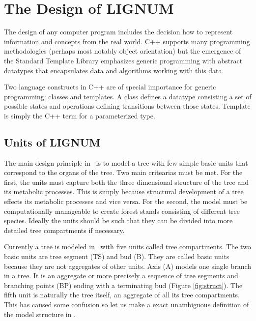 \chapter{The Design of LIGNUM}

The  design of  any  computer  program includes  the  decision how  to
represent information  and concepts from the real  world. C++ supports
many   programming   methodologies   (perhaps  most   notably   object
orientation)  but  the  emergence  of the  Standard  Template  Library
emphasizes   generic   programming   with  abstract   datatypes   that
encapsulates data and algorithms  working with this data. 

Two language  constructs in C++ are  of special importance for generic
programming: classes  and   templates.   A class  defines   a datatype
consisting   a  set of   possible   states  and  operations   defining
transitions between those states. Template  is simply the C++ term for
a parameterized type.

\section{Units of LIGNUM} 

The main design principle  in  \lignum\ is to  model  a tree with  few
simple basic units that correspond to the organs of the tree. Two main
critearias must  be met.  For the first,  the  units must capture both
the  three  dimensional   structure of  the   tree   and its metabolic
processes.   This is simply because  structural  development of a tree
effects  its metabolic processes and  vice versa.  For the second, the
model must  be  computationally  manageable  to create   forest stands
consisting of  different  tree species.   Ideally  the units should be
such that they can be divided  into more detailed tree compartments if
necessary.

Currently a  tree is modeled in  \lignum\ with five  units called tree
compartments.  The two basic units  are tree segment (TS) and bud (B).
They are called  basic units because they are  not aggregates of other
units.   Axis (A)  models  one single  branch  in a  tree.   It is  an
aggregate or more precisely a  sequence of tree segments and branching
points (BP)  ending with a terminating  bud (Figure \ref{fig:struct}).
The fifth unit  is naturally the tree itself, an  aggregate of all its
tree compartments.  This has  caused some confusion  so let us  make a
exact unambiguous definition of the model structure in \lignum.

